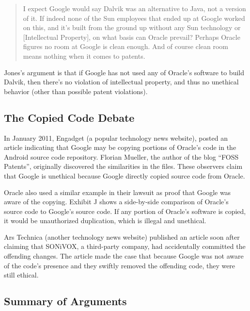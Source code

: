 \documentclass[11pt]{article}
\begin{document}
\begin{multicols}{2}
\begin{quotation}
I expect Google would say Dalvik was an alternative to Java, not a version of
it. If indeed none of the Sun employees that ended up at Google worked on this,
and it's built from the ground up without any Sun technology or [Intellectual
Property], on what basis can Oracle prevail? Perhaps Oracle figures no room at
Google is clean enough. And of course clean room means nothing when it comes to
patents.
\end{quotation}

Jones's argument is that if Google has not used any of Oracle's software to
build Dalvik, then there's no violation of intellectual property, and thus no
unethical behavior (other than possible patent violations).


\subsection{The Copied Code Debate} %
\label{sub:fosspatents}

In January 2011, Engadget (a popular technology news website), posted an article
indicating that Google may be copying portions of Oracle's code in the Android
source code repository.  \cite{android-copies-java-code}  Florian Mueller, the
author of the blog ``FOSS Patents'', originally discovered the similarities in
the files.  \cite{fosspatents} These observers claim that Google is unethical
because Google directly copied source code from Oracle.


Oracle also used a similar example in their lawsuit as proof that Google was
aware of the copying.  Exhibit J shows a side-by-side comparison of Oracle's
source code to Google's source code.  If any portion of Oracle's software is
copied, it would be unauthorized duplication, which is illegal and unethical.

Ars Technica (another technology news website) published an article soon after
claiming that SONiVOX, a third-party company, had accidentally committed the
offending changes.  \cite{ars-tech-copying}  The article made the case that
because Google was not aware of the code's presence and they swiftly removed the
offending code, they were still ethical.


\subsection{Summary of Arguments} %
\label{sub:args-summary}


\end{multicols}
\end{document}
